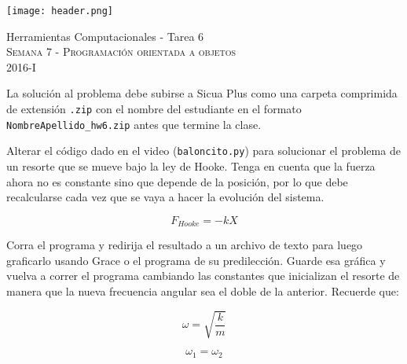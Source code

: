 \documentclass[11pt,letterpaper]{exam}
\begin{document}
\begin{center}

\texttt{[image: header.png]}

\vspace{1.0cm}
{\Large Herramientas Computacionales - Tarea 6} \\
\textsc{Semana 7 - Programaci\'on orientada a objetos}\\
2016-I\\
\end{center}



\vspace{0.5cm}

\noindent
La soluci\'on al problema debe subirse a Sicua Plus como una carpeta comprimida de extensi\'on \verb".zip" con el nombre del estudiante en el formato \verb"NombreApellido_hw6.zip" antes que termine la clase.

\vspace{0.5cm}

\begin{questions}
 

Alterar el c\'odigo dado en el video (\verb"baloncito.py") para solucionar el problema de un resorte que se mueve bajo la ley de Hooke. Tenga en cuenta que la fuerza ahora no es constante sino que depende de la posici\'on, por lo que debe recalcularse cada vez que se vaya a hacer la evoluci\'on del sistema.

\begin{equation}
F_{Hooke}=-kX
\end{equation}



Corra el programa y redirija el resultado a un archivo de texto para luego graficarlo usando Grace o el programa de su predilecci\'on. Guarde esa gr\'afica y vuelva a correr el programa cambiando las constantes que inicializan el resorte de manera que la nueva frecuencia angular sea el doble de la anterior. Recuerde que:


\begin{equation}
\omega=\sqrt{\frac{k}{m}}
\end{equation}

\begin{equation}
\omega_{1}=\omega_{2}
\end{equation}


\end{questions}
\end{document}
